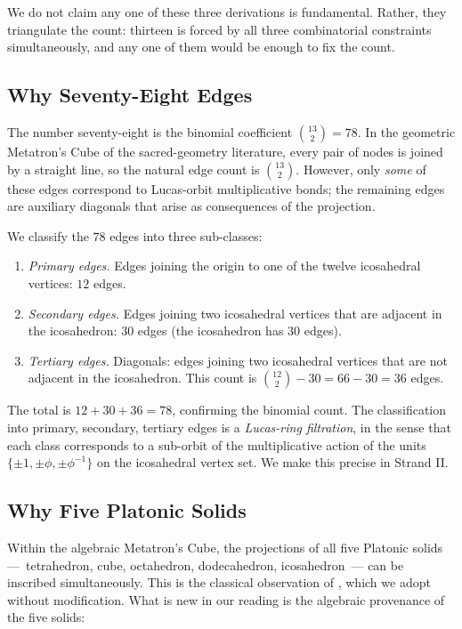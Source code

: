 We do not claim any one of these three derivations is fundamental.
Rather, they triangulate the count: thirteen is forced by all three
combinatorial constraints simultaneously, and any one of them would
be enough to fix the count.

\subsection{Why Seventy-Eight Edges}
\label{sec:13-seventy-eight}

The number seventy-eight is the binomial coefficient
$\binom{13}{2} = 78$. In the geometric Metatron's Cube of the
sacred-geometry literature, every pair of nodes is joined by a
straight line, so the natural edge count is $\binom{13}{2}$.
However, only \emph{some} of these edges correspond to Lucas-orbit
multiplicative bonds; the remaining edges are auxiliary diagonals
that arise as consequences of the projection.

We classify the $78$ edges into three sub-classes:

\begin{enumerate}
\item \emph{Primary edges.} Edges joining the origin to one of the
  twelve icosahedral vertices: $12$ edges.
\item \emph{Secondary edges.} Edges joining two icosahedral
  vertices that are adjacent in the icosahedron: $30$ edges
  (the icosahedron has $30$ edges).
\item \emph{Tertiary edges.} Diagonals: edges joining two
  icosahedral vertices that are not adjacent in the icosahedron.
  This count is $\binom{12}{2} - 30 = 66 - 30 = 36$ edges.
\end{enumerate}

The total is $12 + 30 + 36 = 78$, confirming the binomial count.
The classification into primary, secondary, tertiary edges is a
\emph{Lucas-ring filtration}, in the sense that each class
corresponds to a sub-orbit of the multiplicative action of the
units $\{\pm 1, \pm \phi, \pm \phi^{-1}\}$ on the icosahedral
vertex set. We make this precise in Strand II.

\subsection{Why Five Platonic Solids}
\label{fa_13:sec:13-five-platonic}

Within the algebraic Metatron's Cube, the projections of all five
Platonic solids ---~tetrahedron, cube, octahedron, dodecahedron,
icosahedron~--- can be inscribed simultaneously. This is the
classical observation of \cite{coxeter1973regular}, which we adopt
without modification. What is new in our reading is the algebraic
provenance of the five solids:

